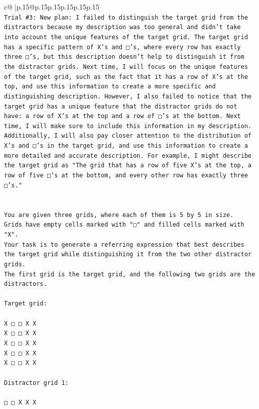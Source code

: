 \documentclass{article}
\begin{document}
{\begin{supertabular}{c@{$\;$}|p{.15\linewidth}@{}p{.15\linewidth}p{.15\linewidth}p{.15\linewidth}p{.15\linewidth}p{.15\linewidth}}
{{{\\ 
\texttt{Trial \#3: New plan: I failed to distinguish the target grid from the distractors because my description was too general and didn't take into account the unique features of the target grid. The target grid has a specific pattern of X's and □'s, where every row has exactly three □'s, but this description doesn't help to distinguish it from the distractor grids. Next time, I will focus on the unique features of the target grid, such as the fact that it has a row of X's at the top, and use this information to create a more specific and distinguishing description. However, I also failed to notice that the target grid has a unique feature that the distractor grids do not have: a row of X's at the top and a row of □'s at the bottom. Next time, I will make sure to include this information in my description. Additionally, I will also pay closer attention to the distribution of X's and □'s in the target grid, and use this information to create a more detailed and accurate description. For example, I might describe the target grid as "The grid that has a row of five X's at the top, a row of five □'s at the bottom, and every other row has exactly three □'s."} \\
\\ 
\\ 
\texttt{You are given three grids, where each of them is 5 by 5 in size.} \\
\texttt{Grids have empty cells marked with "▢" and filled cells marked with "X".} \\
\texttt{Your task is to generate a referring expression that best describes the target grid while distinguishing it from the two other distractor grids.} \\
\texttt{The first grid is the target grid, and the following two grids are the distractors.} \\
\\ 
\texttt{Target grid:} \\
\\ 
\texttt{X □ □ X X} \\
\texttt{X □ □ X X} \\
\texttt{X □ □ X X} \\
\texttt{X □ □ X X} \\
\texttt{X □ □ X X} \\
\\ 
\texttt{Distractor grid 1:} \\
\\ 
\texttt{□ □ X X X} \\
}}}
\end{supertabular}}
\end{document}
